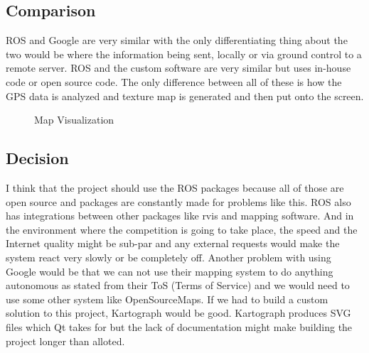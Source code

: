 \documentclass[onecolumn, draftclsnofoot, 10pt, compsoc]{IEEEtran}
\begin{document}
\subsection{Comparison}
ROS and Google are very similar with the only differentiating thing about the two would be where the information being sent, locally or via ground control to a remote server.
ROS and the custom software are very similar but uses in-house code or open source code.
The only difference between all of these is how the GPS data is analyzed and texture map is generated and then put onto the screen.
\begin{figure}[h]
\centering
{}
\captionsetup{justification=centering}
\centering\caption{Map Visualization}
\end{figure}

\subsection{Decision}
I think that the project should use the ROS packages because all of those are open source and packages are constantly made for problems like this.
ROS also has integrations between other packages like rvis and mapping software.
And in the environment where the competition is going to take place, the speed and the Internet quality might be sub-par and any external requests would make the system react very slowly or be completely off.
Another problem with using Google would be that we can not use their mapping system to do anything autonomous as stated from their ToS (Terms of Service) and we would need to use some other system like OpenSourceMaps. 
If we had to build a custom solution to this project, Kartograph would be good.
Kartograph produces SVG files which Qt takes for but the lack of documentation might make building the project longer than alloted.
\end{document}
